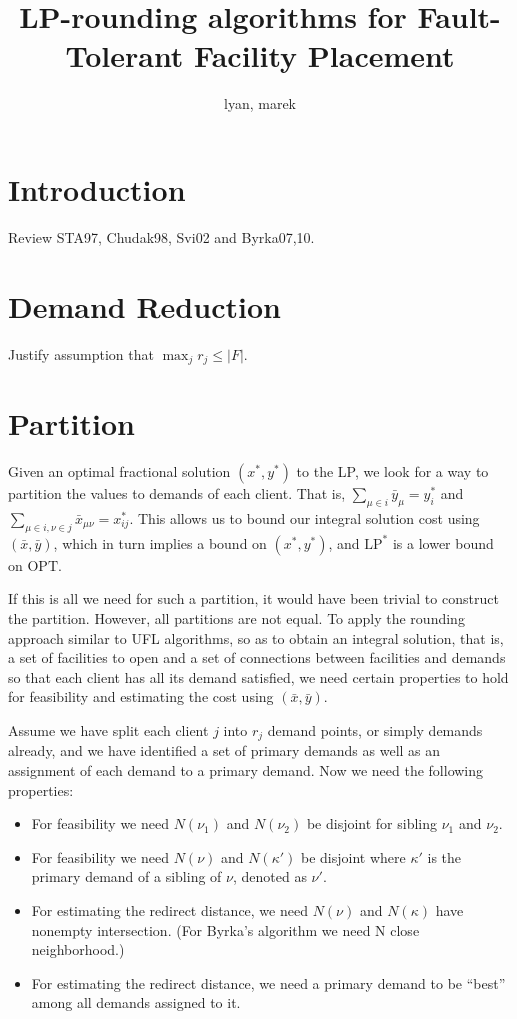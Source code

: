 \documentclass{article}
\title{LP-rounding algorithms for Fault-Tolerant Facility Placement}
\author{lyan, marek}
\begin{document}
\section{Introduction}
Review STA97, Chudak98, Svi02 and Byrka07,10.

\section{Demand Reduction}
Justify assumption that $\max_j r_j \leq |F|$.

\section{Partition}
Given an optimal fractional solution $(x^\ast, y^\ast)$ to
the LP, we look for a way to partition the values to demands
of each client. That is, $\sum_{\mu \in i} \bar y_{\mu} =
y_i^\ast$ and $\sum_{\mu \in i, \nu \in j} \bar x_{\mu\nu} =
x_{ij}^\ast$. This allows us to bound our integral solution
cost using $(\bar x, \bar y)$, which in turn implies a bound
on $(x^\ast, y^\ast)$, and $\text{LP}^\ast$ is a lower bound
on $\text{OPT}$.

If this is all we need for such a partition, it would have
been trivial to construct the partition. However, all
partitions are not equal. To apply the rounding approach
similar to UFL algorithms, so as to obtain an integral
solution, that is, a set of facilities to open and a set of
connections between facilities and demands so that each
client has all its demand satisfied, we need certain
properties to hold for feasibility and estimating the cost
using $(\bar x, \bar y)$.

Assume we have split each client $j$ into $r_j$ demand
points, or simply demands already, and we have identified a
set of primary demands as well as an assignment of each
demand to a primary demand. Now we need the following
properties:
\begin{itemize}
\item For feasibility we need $N(\nu_1)$ and $N(\nu_2)$ be
  disjoint for sibling $\nu_1$ and $\nu_2$.
\item For feasibility we need $N(\nu)$ and $N(\kappa')$ be
  disjoint where $\kappa'$ is the primary demand of a
  sibling of $\nu$, denoted as $\nu'$.

\item For estimating the redirect distance, we need $N(\nu)$
  and $N(\kappa)$ have nonempty intersection. (For Byrka's
  algorithm we need N close neighborhood.)
\item For estimating the redirect distance, we need a
  primary demand to be ``best'' among all demands assigned
  to it.
\end{itemize}
\end{document}
